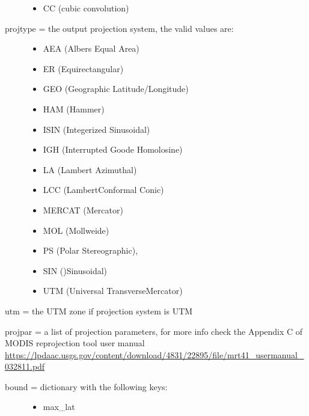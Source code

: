\documentclass[a4paper,11pt,oneside]{sphinxmanual}
\begin{document}
\begin{fulllineitems}
\begin{fulllineitems}
\begin{description}
\begin{itemize}
\item {} 
CC (cubic convolution)

\end{itemize}

\item[{projtype = the output projection system, the valid values are:}] \leavevmode\begin{itemize}
\item {} 
AEA (Albers Equal Area)

\item {} 
ER (Equirectangular)

\item {} 
GEO (Geographic Latitude/Longitude)

\item {} 
HAM (Hammer)

\item {} 
ISIN (Integerized Sinusoidal)

\item {} 
IGH (Interrupted Goode Homolosine)

\item {} 
LA (Lambert Azimuthal)

\item {} 
LCC (LambertConformal Conic)

\item {} 
MERCAT (Mercator)

\item {} 
MOL (Mollweide)

\item {} 
PS (Polar Stereographic),

\item {} 
SIN ()Sinusoidal)

\item {} 
UTM (Universal TransverseMercator)

\end{itemize}

\end{description}

utm = the UTM zone if projection system is UTM

projpar = a list of projection parameters, for more info check
the Appendix C of MODIS reprojection tool user manual
\href{https://lpdaac.usgs.gov/content/download/4831/22895/file/mrt41\_usermanual\_032811.pdf}{https://lpdaac.usgs.gov/content/download/4831/22895/file/mrt41\_usermanual\_032811.pdf}
\begin{description}
\item[{bound = dictionary with the following keys:}] \leavevmode\begin{itemize}
\item {} 
max\_lat


\end{itemize}
\end{description}
\end{fulllineitems}
\end{fulllineitems}
\end{document}
